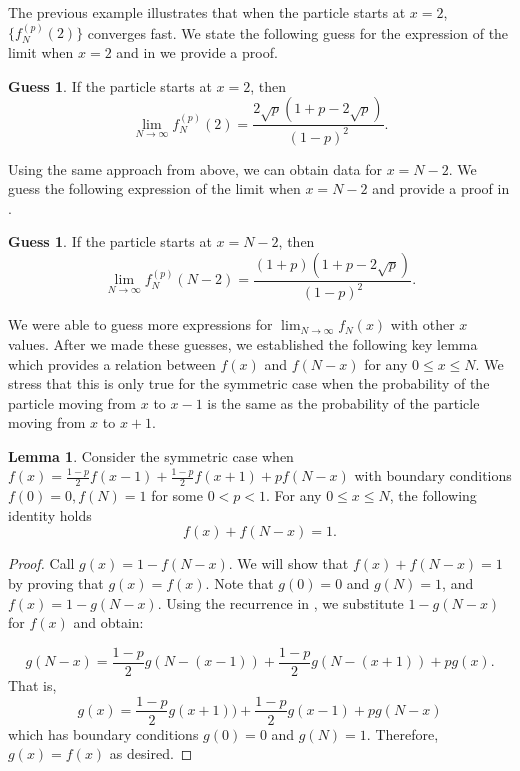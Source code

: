 \documentclass[reqno]{amsart}
\theoremstyle{definition}
\newtheorem{lemma}[theorem]{Lemma}
\newtheorem{guess}[theorem]{Guess}
\theoremstyle{definition}
\theoremstyle{remark}
\begin{document}
The previous example illustrates that when the particle starts at $x=2$, $\{f_N^{(p)}(2)\}$ converges fast. We state the following guess for the expression of the limit when $x=2$ and in  we provide a proof.

\begin{guess}\label{guess:x=2}
 If the particle starts at $x=2$, then
\[\lim_{N\to\infty}f_N^{(p)}(2)=\frac{2\sqrt{p}(1+p-2\sqrt{p})}{(1-p)^2}.\]
\end{guess}

Using the same approach from above, we can obtain data for $x=N-2$. We guess the following expression of the limit when $x=N-2$ and provide a proof in .

\begin{guess}\label{guess:x=N-2}
 If the particle starts at $x=N-2$, then
\[\lim_{N\to\infty}f_N^{(p)}(N-2)=\frac{(1+p)(1+p-2\sqrt{p})}{(1-p)^2}.\]
\end{guess}


We were able to guess more expressions for $\lim_{N\to\infty} f_N(x)$ with other $x$ values. After we made these guesses, we established the following key lemma which provides a relation between $f(x)$ and $f(N-x)$ for any $0\leq x\leq N$. We stress that this is only true for the symmetric case when the probability of the particle moving from $x$ to $x-1$ is the same as the probability of the particle moving from $x$ to $x+1$.

\begin{lemma}\label{lem:mirror probability equal to 1}
Consider the symmetric case when $f(x)=\frac{1-p}{2}f(x-1)+\frac{1-p}{2}f(x+1)+pf(N-x)$ with boundary conditions $f(0)=0, f(N)=1$ for some $0<p<1$. For any $0\leq x\leq N$, the following identity holds \[f(x) + f(N-x)=1.\]
\end{lemma}

\begin{proof}
    Call $g(x)=1-f(N-x)$. We will show that $f(x)+f(N-x)=1$ by proving that $g(x)=f(x)$. Note that $g(0)=0$ and $g(N)=1$, and $f(x)=1-g(N-x)$. Using the recurrence in , we substitute $1-g(N-x)$ for $f(x)$ and obtain:
    
    \begin{equation*}
        g(N-x)=\frac{1-p}{2}g(N-(x-1))+\frac{1-p}{2}g(N-(x+1))+pg(x).
    \end{equation*}
    That is,
    \begin{equation*}
        g(x)=\frac{1-p}{2}g(x+1))+\frac{1-p}{2}g(x-1)+pg(N-x)
    \end{equation*}
    which has boundary conditions $g(0)=0$ and $g(N)=1$. Therefore, $g(x)=f(x)$ as desired.
\end{proof}
\end{document}
